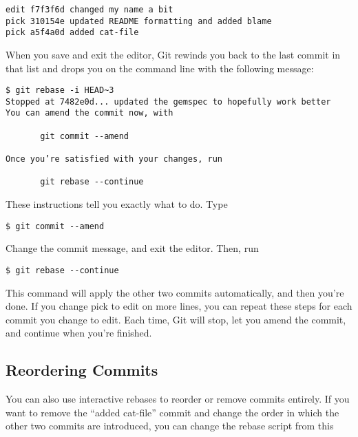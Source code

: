 \documentclass[a4paper]{book}
\begin{document}
\begin{shaded}\begin{verbatim}
edit f7f3f6d changed my name a bit
pick 310154e updated README formatting and added blame
pick a5f4a0d added cat-file
\end{verbatim}\end{shaded}

When you save and exit the editor, Git rewinds you back to the last commit in that list and drops you on the command line with the following message:

\begin{shaded}\begin{verbatim}
$ git rebase -i HEAD~3
Stopped at 7482e0d... updated the gemspec to hopefully work better
You can amend the commit now, with

       git commit --amend

Once you’re satisfied with your changes, run

       git rebase --continue
\end{verbatim}\end{shaded}

These instructions tell you exactly what to do. Type

\begin{shaded}\begin{verbatim}
$ git commit --amend
\end{verbatim}\end{shaded}

Change the commit message, and exit the editor. Then, run

\begin{shaded}\begin{verbatim}
$ git rebase --continue
\end{verbatim}\end{shaded}

This command will apply the other two commits automatically, and then you're done. If you change pick to edit on more lines, you can repeat these steps for each commit you change to edit. Each time, Git will stop, let you amend the commit, and continue when you're finished.

\subsection{Reordering Commits}\label{reordering-commits}

You can also use interactive rebases to reorder or remove commits entirely. If you want to remove the “added cat-file” commit and change the order in which the other two commits are introduced, you can change the rebase script from this
\end{document}
